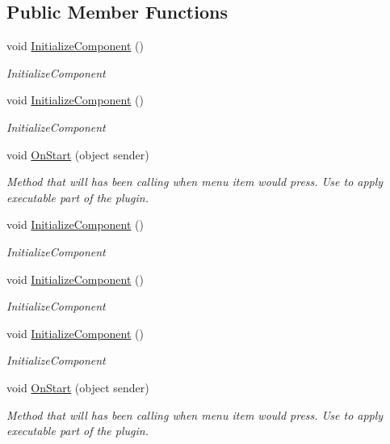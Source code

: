 \subsection*{Public Member Functions}
\begin{DoxyCompactItemize}
\item 
void \mbox{\hyperlink{class_example_plugin1_1_1_sub_plugin2_control_a9c58374e33843b9b7b75955801064f9b}{Initialize\+Component}} ()
\begin{DoxyCompactList}\small\item\em Initialize\+Component \end{DoxyCompactList}\item 
void \mbox{\hyperlink{class_example_plugin1_1_1_sub_plugin2_control_a9c58374e33843b9b7b75955801064f9b}{Initialize\+Component}} ()
\begin{DoxyCompactList}\small\item\em Initialize\+Component \end{DoxyCompactList}\item 
void \mbox{\hyperlink{class_example_plugin1_1_1_sub_plugin2_control_ac44073957fa6c64503888c57d6d5d471}{On\+Start}} (object sender)
\begin{DoxyCompactList}\small\item\em Method that will has been calling when menu item would press. Use to apply executable part of the plugin. \end{DoxyCompactList}\item 
void \mbox{\hyperlink{class_example_plugin1_1_1_sub_plugin2_control_a9c58374e33843b9b7b75955801064f9b}{Initialize\+Component}} ()
\begin{DoxyCompactList}\small\item\em Initialize\+Component \end{DoxyCompactList}\item 
void \mbox{\hyperlink{class_example_plugin1_1_1_sub_plugin2_control_a9c58374e33843b9b7b75955801064f9b}{Initialize\+Component}} ()
\begin{DoxyCompactList}\small\item\em Initialize\+Component \end{DoxyCompactList}\item 
void \mbox{\hyperlink{class_example_plugin1_1_1_sub_plugin2_control_a9c58374e33843b9b7b75955801064f9b}{Initialize\+Component}} ()
\begin{DoxyCompactList}\small\item\em Initialize\+Component \end{DoxyCompactList}\item 
void \mbox{\hyperlink{class_example_plugin1_1_1_sub_plugin2_control_ac44073957fa6c64503888c57d6d5d471}{On\+Start}} (object sender)
\begin{DoxyCompactList}\small\item\em Method that will has been calling when menu item would press. Use to apply executable part of the plugin. \end{DoxyCompactList}\end{DoxyCompactItemize}
